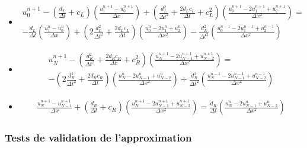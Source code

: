 \begingroup
\footnotesize
\begin{itemize}
 \item \begin{equation*}
\label{eq:appDiscTBCP1}
	\begin{aligned}
    u_0^{n+1} - \left( \frac{d_L}{\Delta t} + c_L \right) \left( \frac{u_1^{n+1} - u_0^{n+1}}{\Delta x}\right) +   \left( \frac{d_L^2}{\Delta t^2} + \frac{2d_Lc_L}{\Delta t} + c_L^2  \right) \left(  \frac{u_0^{n+1} - 2u_1^{n+1} + u_2^{n+1}}{\Delta x^2} \right)  = \\
        -\frac{d_L}{\Delta t}\left( \frac{u_1^{n} - u_0^{n}}{\Delta x}\right) +  \left( 2\frac{d_L^2}{\Delta t^2} + \frac{2d_Lc_L}{\Delta t}\right) \left(  \frac{u_0^{n} - 2u_1^n + u_2^{n}}{\Delta x^2} \right)    -  \frac{d_L^2}{\Delta t^2} \left(  \frac{u_0^{n-1} - 2u_1^{n-1} + u_2^{n-1}}{\Delta x^2} \right)
   \end{aligned}
\end{equation*} 

\item \begin{equation*}
	\begin{aligned}
    u_N^{n+1} - \left( \frac{d_R^2}{\Delta t^2} + \frac{2d_Rc_R}{\Delta t} + c_R^2  \right) \left(  \frac{u_{N}^{n+1} - 2u_{N-1}^{n+1} + u_{N-2}^{n+1}}{\Delta x^2} \right) = \\
     -\left( 2\frac{d_R^2}{\Delta t^2} + \frac{2d_Rc_R}{\Delta t}\right) \left(  \frac{u_N^{n} - 2u_{N-1}^n + u_{N-2}^{n}}{\Delta x^2} \right) + \frac{d_R^2}{\Delta t^2} \left(  \frac{u_N^{n-1} - 2u_{N-1}^{n-1} + u_{N-2}^{n-1}}{\Delta x^2} \right)
    \end{aligned}
\end{equation*} 
   
\item \begin{equation*}
	\begin{aligned}	
    \frac{u_N^{n+1} - u_{N-1}^{n+1}}{\Delta x} + \left( \frac{d_R}{\Delta t} + c_R \right) \left( \frac{u_N^{n+1} -2 u_{N-1}^{n+1} + u_{N-2}^{n+1}}{\Delta x^2}\right) =      \frac{d_R}{\Delta t}\left( \frac{u_{N}^{n} - 2u_{N-1}^{n} + u_{N-2}^n}{\Delta x^2}\right)
    \end{aligned}
\end{equation*}

\end{itemize}

\endgroup

\subsubsection{Tests de validation de l'approximation}

